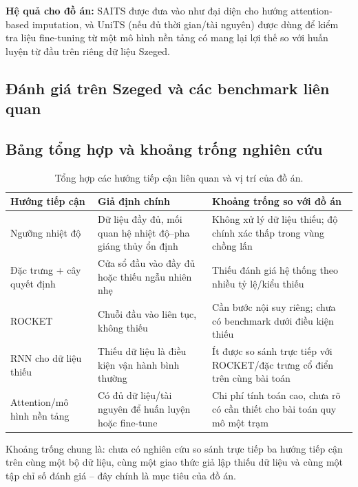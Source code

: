 \textbf{Hệ quả cho đồ án:} SAITS được đưa vào như đại diện cho hướng attention-based
imputation, và UniTS (nếu đủ thời gian/tài nguyên) được dùng để kiểm tra liệu fine-tuning
từ một mô hình nền tảng có mang lại lợi thế so với huấn luyện từ đầu trên riêng dữ liệu
Szeged.

\subsection{Đánh giá trên Szeged và các benchmark liên quan}
\label{sec:lit-benchmark-szeged}


\subsection{Bảng tổng hợp và khoảng trống nghiên cứu}
\label{sec:lit-tong-hop}

\begin{table}[H]
\centering
\caption{Tổng hợp các hướng tiếp cận liên quan và vị trí của đồ án.}
\label{tab:lit-summary}
\begin{tabular}{@{}p{3.1cm}p{4.3cm}p{4.3cm}@{}}
\toprule
\textbf{Hướng tiếp cận} & \textbf{Giả định chính} & \textbf{Khoảng trống so với đồ án} \\
\midrule
Ngưỡng nhiệt độ \cite{jennings2018,webb2025} & Dữ liệu đầy đủ, mối quan hệ nhiệt độ--pha giáng thủy ổn định & Không xử lý dữ liệu thiếu; độ chính xác thấp trong vùng chồng lấn \\
Đặc trưng + cây quyết định \cite{christ2018tsfresh,lubba2019catch22,chen2016xgboost} & Cửa sổ đầu vào đầy đủ hoặc thiếu ngẫu nhiên nhẹ & Thiếu đánh giá hệ thống theo nhiều tỷ lệ/kiểu thiếu \\
ROCKET \cite{dempster2021minirocket,tan2022multirocket} & Chuỗi đầu vào liên tục, không thiếu & Cần bước nội suy riêng; chưa có benchmark dưới điều kiện thiếu \\
RNN cho dữ liệu thiếu \cite{che2018grud,cao2018brits} & Thiếu dữ liệu là điều kiện vận hành bình thường & Ít được so sánh trực tiếp với ROCKET/đặc trưng cổ điển trên cùng bài toán \\
Attention/mô hình nền tảng \cite{du2023saits,gao2024units} & Có đủ dữ liệu/tài nguyên để huấn luyện hoặc fine-tune & Chi phí tính toán cao, chưa rõ có cần thiết cho bài toán quy mô một trạm \\
\bottomrule
\end{tabular}
\end{table}

Khoảng trống chung là: chưa có nghiên cứu so sánh trực tiếp ba hướng tiếp cận trên cùng
một bộ dữ liệu, cùng một giao thức giả lập thiếu dữ liệu và cùng một tập chỉ số đánh giá
-- đây chính là mục tiêu của đồ án.
